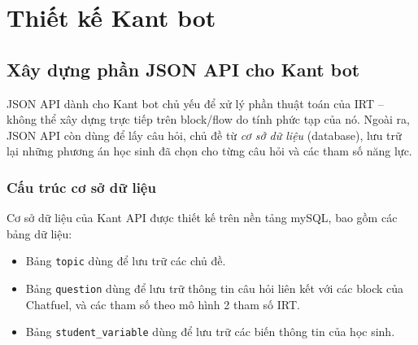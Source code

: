 \section{Thiết kế Kant bot}
\subsection{Xây dựng phần JSON API cho Kant bot}
JSON API dành cho Kant bot chủ yếu để xử lý phần thuật toán của IRT – không thể xây dựng trực tiếp trên block/flow do tính phức tạp của nó. Ngoài ra, JSON API còn dùng để lấy câu hỏi, chủ đề từ \textit{cơ sở dữ liệu} (database), lưu trữ lại những phương án học sinh đã chọn cho từng câu hỏi và các tham số năng lực.

\subsubsection{Cấu trúc cơ sở dữ liệu}
Cơ sở dữ liệu của Kant API được thiết kế trên nền tảng mySQL, bao gồm các bảng dữ liệu: \begin{itemize}
	\item Bảng \texttt{topic} dùng để lưu trữ các chủ đề.
	\item Bảng \texttt{question} dùng để lưu trữ thông tin câu hỏi liên kết với các block của Chatfuel, và các tham số theo mô hình 2 tham số IRT.
	\item Bảng \texttt{student\_variable} dùng để lưu trữ các biến thông tin của học sinh.
\end{itemize}

